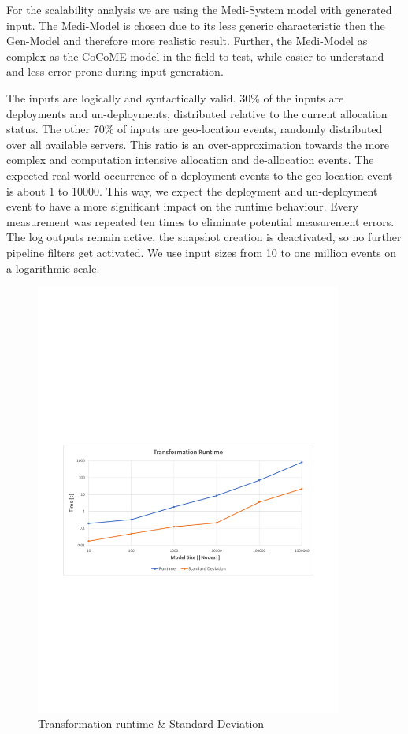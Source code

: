 For the scalability analysis we are using the Medi-System model with generated input. The Medi-Model is chosen due to its less generic characteristic then the Gen-Model and therefore more realistic result. Further, the Medi-Model as complex as the CoCoME model in the field to test, while easier to understand and less error prone during input generation.

The inputs are logically and syntactically valid. 30\% of the inputs are deployments and un-deployments, distributed relative to the current allocation status. The other 70\% of inputs are geo-location events, randomly distributed over all available servers. This ratio is an over-approximation towards the more complex and computation intensive allocation and de-allocation events. The expected real-world occurrence of a deployment events to the geo-location event is about 1 to 10000. This way, we expect the deployment and un-deployment event to have a more significant impact on the runtime behaviour. Every measurement was repeated ten times to eliminate potential measurement errors. The log outputs remain active, the snapshot creation is deactivated, so no further pipeline filters get activated. We use input sizes from 10 to one million events on a logarithmic scale.

\begin{figure}[h]
	\centering
	\includegraphics[trim = 10mm 90mm 10mm 110mm, clip, width=0.90\textwidth]{graphs/Runtime_Transformation}
	\caption{Transformation runtime \& Standard Deviation}
	\label{fig:eval:trans:runtime}
\end{figure}

